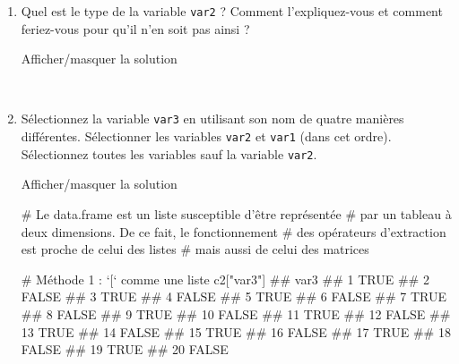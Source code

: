 \documentclass[12pt,]{article}
\newenvironment{Shaded}{}{}
\newcommand{\KeywordTok}[1]{\textcolor[rgb]{0.00,0.00,1.00}{{#1}}}
\newcommand{\DataTypeTok}[1]{{#1}}
\newcommand{\DecValTok}[1]{{#1}}
\newcommand{\StringTok}[1]{\textcolor[rgb]{0.00,0.50,0.50}{{#1}}}
\newcommand{\CommentTok}[1]{\textcolor[rgb]{0.00,0.50,0.00}{{#1}}}
\newcommand{\OtherTok}[1]{\textcolor[rgb]{1.00,0.25,0.00}{{#1}}}
\newcommand{\NormalTok}[1]{{#1}}
\begin{document}
\begin{enumerate}
  ~
\item
  Quel est le type de la variable \texttt{var2} ? Comment
  l'expliquez-vous et comment feriez-vous pour qu'il n'en soit pas ainsi
  ?

  Afficher/masquer la solution

  \hypertarget{sol12}{}
\begin{Shaded}
\end{Shaded}

  ~
\item
  Sélectionnez la variable \texttt{var3} en utilisant son nom de quatre
  manières différentes. Sélectionner les variables \texttt{var2} et
  \texttt{var1} (dans cet ordre). Sélectionnez toutes les variables sauf
  la variable \texttt{var2}.

  Afficher/masquer la solution

  \hypertarget{sol13}{}
\begin{Shaded}
\begin{Highlighting}[]
\CommentTok{# Le data.frame est un liste susceptible d'être représentée}
\CommentTok{# par un tableau à deux dimensions. De ce fait, le fonctionnement}
\CommentTok{# des opérateurs d'extraction est proche de celui des listes}
\CommentTok{# mais aussi de celui des matrices}

\CommentTok{# Méthode 1 : `[` comme une liste}
\NormalTok{c2[}\StringTok{"var3"}\NormalTok{]}
\NormalTok{##     var3}
\NormalTok{## 1   TRUE}
\NormalTok{## 2  FALSE}
\NormalTok{## 3   TRUE}
\NormalTok{## 4  FALSE}
\NormalTok{## 5   TRUE}
\NormalTok{## 6  FALSE}
\NormalTok{## 7   TRUE}
\NormalTok{## 8  FALSE}
\NormalTok{## 9   TRUE}
\NormalTok{## 10 FALSE}
\NormalTok{## 11  TRUE}
\NormalTok{## 12 FALSE}
\NormalTok{## 13  TRUE}
\NormalTok{## 14 FALSE}
\NormalTok{## 15  TRUE}
\NormalTok{## 16 FALSE}
\NormalTok{## 17  TRUE}
\NormalTok{## 18 FALSE}
\NormalTok{## 19  TRUE}
\NormalTok{## 20 FALSE}


\end{Highlighting}
\end{Shaded}
\end{enumerate}
\end{document}
